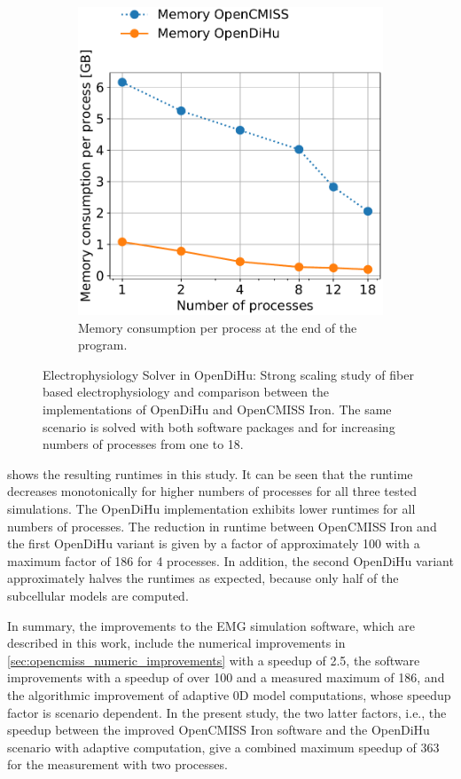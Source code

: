 \begin{figure}
\begin{subfigure}[t]{0.47\textwidth}
    \includegraphics[width=\textwidth]{images/results/studies/0_strong_scaling_memory.pdf}%
    \caption{Memory consumption per process at the end of the program.}%
    \label{fig:0_strong_scaling_memory}%
  \end{subfigure}   
  \caption{Electrophysiology Solver in OpenDiHu: Strong scaling study of fiber based electrophysiology and comparison between the implementations of OpenDiHu and OpenCMISS Iron. The same scenario is solved with both software packages and for increasing numbers of processes from one to 18.}%
  \label{fig:0_strong_scaling}%
\end{figure}%

 shows the resulting runtimes in this study. It can be seen that the runtime decreases monotonically for higher numbers of processes for all three tested simulations. The OpenDiHu implementation exhibits lower runtimes for all numbers of processes. The reduction in runtime between OpenCMISS Iron and the first OpenDiHu variant is given by a factor of approximately 100 with a maximum factor of 186 for 4 processes. In addition, the second OpenDiHu variant approximately halves the runtimes as expected, because only half of the subcellular models are computed.

In summary, the improvements to the EMG simulation software, which are described in this work, include the numerical improvements in \cref{sec:opencmiss_numeric_improvements} with a speedup of 2.5, the software improvements with a speedup of over 100 and a measured maximum of 186, and the algorithmic improvement of adaptive 0D model computations, whose speedup factor is scenario dependent. In the present study, the two latter factors, i.e., the speedup between the improved OpenCMISS Iron software and the OpenDiHu scenario with adaptive computation, give a combined maximum speedup of 363 for the measurement with two processes.

